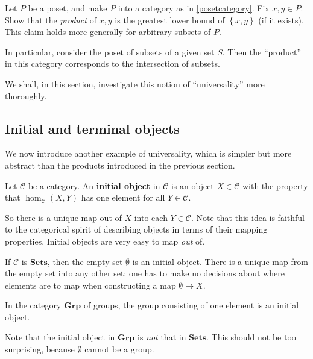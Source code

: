 \begin{exercise} 
Let $P$ be a poset, and make $P$ into a category as in \cref{posetcategory}.
Fix $x, y \in P$. Show that the \emph{product} of $x,y$ is the greatest lower 
bound of $\left\{x,y\right\}$ (if it exists). This claim holds more generally
for arbitrary subsets of $P$.

In particular, consider the poset of subsets of a given set $S$. Then the
``product'' in this category corresponds to the intersection of subsets.
\end{exercise} 

We shall, in this section, investigate this notion of ``universality''
more thoroughly.


\subsection{Initial and terminal objects}

We now introduce another example of universality, which is simpler but more
abstract than the products introduced in the previous section.

\begin{definition}
Let $\mathcal{C}$ be a category. An \textbf{initial object} in $\mathcal{C}$ is an
object $X \in \mathcal{C}$ with the property that $\hom_{\mathcal{C}}(X, Y)$ has one
element for all $Y \in \mathcal{C}$.

\end{definition}

So there is a unique map out of $X$ into each $Y \in \mathcal{C}$.
Note that this idea is faithful to the categorical spirit of describing objects
in terms of their mapping properties. Initial objects are very easy to map
\emph{out} of.


\begin{example}
If $\mathcal{C}$ is $\mathbf{Sets}$, then the empty set $\emptyset$ is an
initial object. There is a unique map from the empty set into any other set;
one has to make no decisions about where elements are to map when
constructing a map $\emptyset \to X$.
\end{example}

\begin{example} 
In the category $\mathbf{Grp}$ of groups, the group consisting of one element
is an initial object.
\end{example} 

Note that the initial object in $\mathbf{Grp}$ is \emph{not} that in
$\mathbf{Sets}$. This should not be too surprising, because $\emptyset$ cannot
be a group.

